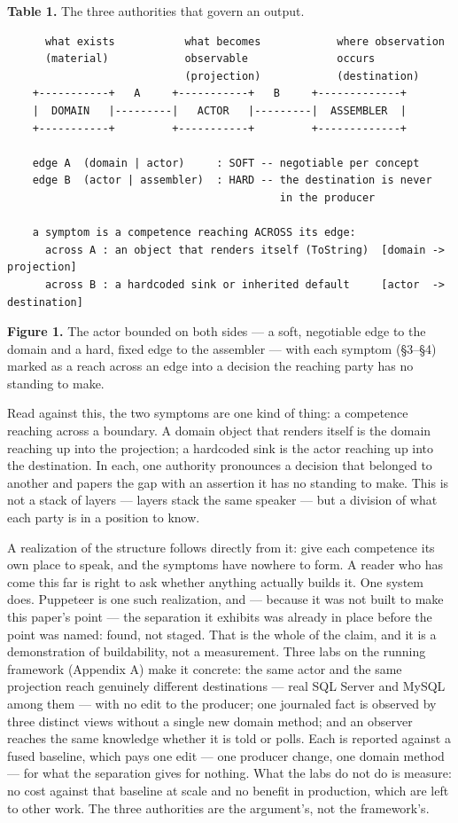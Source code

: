 \documentclass[
]{article}
\begin{document}
\textbf{Table 1.} The three authorities that govern an output.

\begin{verbatim}
      what exists           what becomes            where observation
      (material)            observable              occurs
                            (projection)            (destination)
    +-----------+   A     +-----------+   B     +-------------+
    |  DOMAIN   |---------|   ACTOR   |---------|  ASSEMBLER  |
    +-----------+         +-----------+         +-------------+

    edge A  (domain | actor)     : SOFT -- negotiable per concept
    edge B  (actor | assembler)  : HARD -- the destination is never
                                           in the producer

    a symptom is a competence reaching ACROSS its edge:
      across A : an object that renders itself (ToString)  [domain -> projection]
      across B : a hardcoded sink or inherited default     [actor  -> destination]
\end{verbatim}

\textbf{Figure 1.} The actor bounded on both sides --- a soft,
negotiable edge to the domain and a hard, fixed edge to the assembler
--- with each symptom (§3--§4) marked as a reach across an edge into a
decision the reaching party has no standing to make.

Read against this, the two symptoms are one kind of thing: a competence
reaching across a boundary. A domain object that renders itself is the
domain reaching up into the projection; a hardcoded sink is the actor
reaching up into the destination. In each, one authority pronounces a
decision that belonged to another and papers the gap with an assertion
it has no standing to make. This is not a stack of layers --- layers
stack the same speaker --- but a division of what each party is in a
position to know.

A realization of the structure follows directly from it: give each
competence its own place to speak, and the symptoms have nowhere to
form. A reader who has come this far is right to ask whether anything
actually builds it. One system does. Puppeteer is one such realization,
and --- because it was not built to make this paper's point --- the
separation it exhibits was already in place before the point was named:
found, not staged. That is the whole of the claim, and it is a
demonstration of buildability, not a measurement. Three labs on the
running framework (Appendix A) make it concrete: the same actor and the
same projection reach genuinely different destinations --- real SQL
Server and MySQL among them --- with no edit to the producer; one
journaled fact is observed by three distinct views without a single new
domain method; and an observer reaches the same knowledge whether it is
told or polls. Each is reported against a fused baseline, which pays one
edit --- one producer change, one domain method --- for what the
separation gives for nothing. What the labs do not do is measure: no
cost against that baseline at scale and no benefit in production, which
are left to other work. The three authorities are the argument's, not
the framework's.
\end{document}
